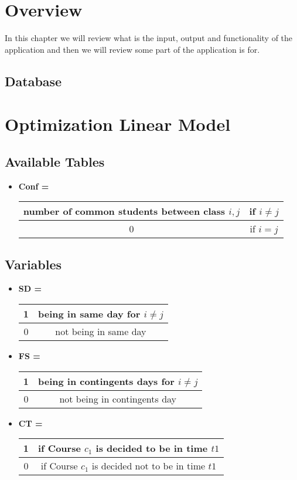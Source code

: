 \documentclass{report}
\begin{document}
\chapter{Overview}
In this chapter we will review what is the input, output and functionality of the application and then we will review some part of the application is for. 
\section{Database}


\chapter{Optimization Linear Model}

\section{Available Tables}
\begin{itemize}
\item
{\textbf{Conf \big[ C \big]\big[ C \big]  \space =} \begin{tabular}{| c | c |} \hline
number of common students between class $i, j$ & if $i \neq j$ \\ \hline
0 & if $i = j$ \\ \hline
\end{tabular}}
\end{itemize}

\section{Variables}

\begin{itemize}
\item
{\textbf{SD \big[ C \big]\big[ C \big]  \space =}
\begin{tabular}{| c | c |} \hline
1 & being in same day for $i \neq j$ \\ \hline
0 & not being in same day \\ \hline
\end{tabular}}

\item{
\textbf{FS \big[ C \big]\big[ C \big]  \space =}
\begin{tabular}{| c | c |} \hline
1 & being in contingents days for $i \neq j$ \\ \hline
0 & not being in contingents day \\ \hline
\end{tabular}}

\item{
\textbf{CT \big[ C \big]\big[ T \big]  \space =}
\begin{tabular}{| c | c |} \hline
1 & if Course $c_1$ is decided to be in time $t1$  \\ \hline
0 & if Course $c_1$ is decided not to be in time $t1$ \\ \hline
\end{tabular}}


\end{itemize}
\end{document}
